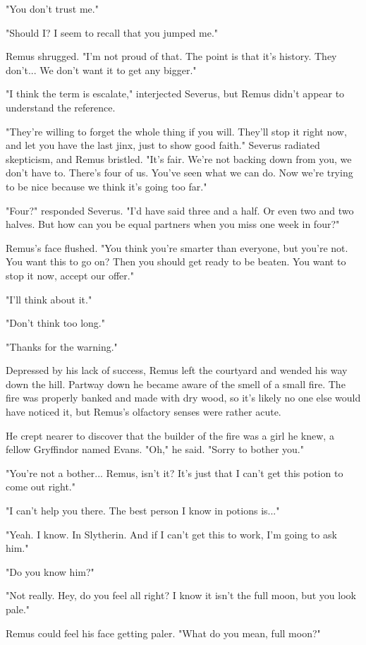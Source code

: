 "You don't trust me."

"Should I? I seem to recall that you jumped me."

Remus shrugged. "I'm not proud of that. The point is that it's history. They don't... We don't want it to get any bigger."

"I think the term is escalate," interjected Severus, but Remus didn't appear to understand the reference.

"They're willing to forget the whole thing if you will. They'll stop it right now, and let you have the last jinx, just to show good faith." Severus radiated skepticism, and Remus bristled. "It's fair. We're not backing down from you, we don't have to. There's four of us. You've seen what we can do. Now we're trying to be nice because we think it's going too far."

"Four?" responded Severus. "I'd have said three and a half. Or even two and two halves. But how can you be equal partners when you miss one week in four?"

Remus's face flushed. "You think you're smarter than everyone, but you're not. You want this to go on? Then you should get ready to be beaten. You want to stop it now, accept our offer."

"I'll think about it."

"Don't think too long."

"Thanks for the warning."

Depressed by his lack of success, Remus left the courtyard and wended his way down the hill. Partway down he became aware of the smell of a small fire. The fire was properly banked and made with dry wood, so it's likely no one else would have noticed it, but Remus's olfactory senses were rather acute.

He crept nearer to discover that the builder of the fire was a girl he knew, a fellow Gryffindor named Evans. "Oh," he said. "Sorry to bother you."

"You're not a bother... Remus, isn't it? It's just that I can't get this potion to come out right."

"I can't help you there. The best person I know in potions is..."

"Yeah. I know. In Slytherin. And if I can't get this to work, I'm going to ask him."

"Do you know him?"

"Not really. Hey, do you feel all right? I know it isn't the full moon, but you look pale."

Remus could feel his face getting paler. "What do you mean, full moon?"

